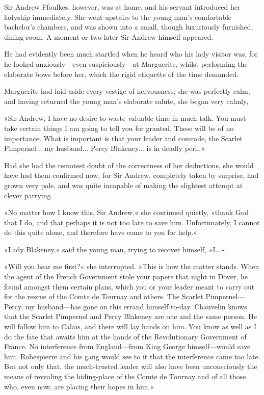 Sir Andrew Ffoulkes, however, was at home, and his servant introduced her ladyship immediately. She went upstairs to the young man's comfortable bachelor's chambers, and was shown into a small, though luxuriously furnished, dining-room. A moment or two later Sir Andrew himself appeared.

He had evidently been much startled when he heard who his lady visitor was, for he looked anxiously\allowbreak---\allowbreak even suspiciously\allowbreak---\allowbreak at Marguerite, whilst performing the elaborate bows before her, which the rigid etiquette of the time demanded.

Marguerite had laid aside every vestige of nervousness; she was perfectly calm, and having returned the young man's elaborate salute, she began very calmly,\longdash


»Sir Andrew, I have no desire to waste valuable time in much talk. You must take certain things I am going to tell you for granted. These will be of no importance. What is important is that your leader and comrade, the Scarlet Pimpernel... my husband... Percy Blakeney... is in deadly peril.«

Had she had the remotest doubt of the correctness of her deductions, she would have had them confirmed now, for Sir Andrew, completely taken by surprise, had grown very pale, and was quite incapable of making the slightest attempt at clever parrying.

»No matter how I know this, Sir Andrew,« she continued quietly, »thank God that I do, and that perhaps it is not too late to save him. Unfortunately, I cannot do this quite alone, and therefore have come to you for help.«

»Lady Blakeney,« said the young man, trying to recover himself, »I...«

»Will you hear me first?« she interrupted. »This is how the matter stands. When the agent of the French Government stole your papers that night in Dover, he found amongst them certain plans, which you or your leader meant to carry out for the rescue of the Comte de Tournay and others. The Scarlet Pimpernel\allowbreak---\allowbreak Percy, my husband\allowbreak---\allowbreak has gone on this errand himself to-day. Chauvelin knows that the Scarlet Pimpernel and Percy Blakeney are one and the same person. He will follow him to Calais, and there will lay hands on him. You know as well as I do the fate that awaits him at the hands of the Revolutionary Government of France. No interference from England\allowbreak---\allowbreak from King George himself\allowbreak---\allowbreak would save him. Robespierre and his gang would see to it that the interference came too late. But not only that, the much-trusted leader will also have been unconsciously the means of revealing the hiding-place of the Comte de Tournay and of all those who, even now, are placing their hopes in him.«


